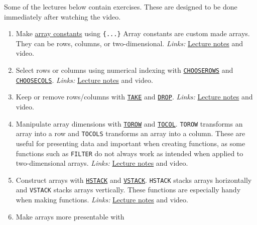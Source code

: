\documentclass[
  letterpaper,
  DIV=11,
  numbers=noendperiod]{scrreprt}
\begin{document}
Some of the lectures below contain exercises. These are designed to be
done immediately after watching the video.

\begin{enumerate}
\def\labelenumi{\arabic{enumi}.}
\item
  Make \href{https://exceljet.net/glossary/array-constant}{array
  constants} using \texttt{\{...\}} Array constants are custom made
  arrays. They can be rows, columns, or two-dimensional. \emph{Links:}
  \href{https://github.com/BI-DS/ELE-3915/blob/main/slides/lecture05/array_constants.xlsx}{Lecture
  notes} and video.
\item
  Select rows or columns using numerical indexing with
  \href{https://exceljet.net/functions/chooserows-function}{\texttt{CHOOSEROWS}}
  and
  \href{https://exceljet.net/functions/choosecols-function}{\texttt{CHOOSECOLS}}.
  \emph{Links:}
  \href{https://github.com/BI-DS/ELE-3915/blob/main/slides/lecture05/choosecols_chooserows.xlsx}{Lecture
  notes} and video.
\item
  Keep or remove rows/columns with
  \href{https://exceljet.net/functions/take-function}{\texttt{TAKE}} and
  \href{https://exceljet.net/functions/drop-function}{\texttt{DROP}}.
  \emph{Links:}
  \href{https://github.com/BI-DS/ELE-3915/blob/main/slides/lecture05/take_drop.xlsx}{Lecture
  notes} and video.
\item
  Manipulate array dimensions with
  \href{https://exceljet.net/functions/torow-function}{\texttt{TOROW}}
  and
  \href{https://exceljet.net/functions/tocol-function}{\texttt{TOCOL}}.
  \texttt{TOROW} transforms an array into a row and \texttt{TOCOLS}
  transforms an array into a column. These are useful for presenting
  data and important when creating functions, as some functions such as
  \texttt{FILTER} do not always work as intended when applied to
  two-dimensional arrays. \emph{Links:}
  \href{https://github.com/BI-DS/ELE-3915/blob/main/slides/lecture05/torow_tocol.xlsx}{Lecture
  notes} and video.
\item
  Construct arrays with
  \href{https://exceljet.net/functions/hstack-function}{\texttt{HSTACK}}
  and
  \href{https://exceljet.net/functions/vstack-function}{\texttt{VSTACK}}.
  \texttt{HSTACK} stacks arrays horizontally and \texttt{VSTACK} stacks
  arrays vertically. These functions are especially handy when making
  functions. \emph{Links:}
  \href{https://github.com/BI-DS/ELE-3915/blob/main/slides/lecture05/hstack_vstack.xlsx}{Lecture
  notes} and video.
\item
  Make arrays more presentable with

\end{enumerate}
\end{document}
